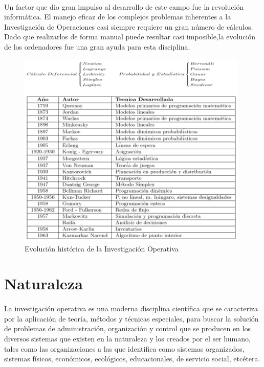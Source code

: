 \documentclass[12pt, a4paper,spanish]{article}
\begin{document}
		\paragraph{}
		Un factor que dio gran impulso al desarrollo de este campo fue la revolución informática. El manejo eficaz de los complejos problemas inherentes a la Investigación de Operaciones casi siempre requiere un gran número de cálculos. Dado que realizarlos de forma manual puede resultar casi imposible,la evolución de los ordenadores fue una gran ayuda para esta disciplina.	\cite{hillier_lieberman_IO}

		\begin{figure}[H]
			\centering
			\includegraphics[width=110mm]{res/desarrollo-historico-de-la-investigacion-de-operaciones.png}
			\caption{Evolución histórica de la Investigación Operativa \protect\cite{gestiopolis_IO_history}}
		\end{figure}


	\section{Naturaleza}
		\paragraph{}
		La investigación operativa es una moderna disciplina científica que se caracteriza por la aplicación de teoría, métodos y técnicas especiales, para buscar la solución de problemas de administración, organización y control que se producen en los diversos sistemas que existen en la naturaleza y los creados por el ser humano, tales como las organizaciones a las que identifica como sistemas organizados, sistemas físicos, económicos, ecológicos, educacionales, de servicio social, etcétera.\cite{wikipedia_IO}
\end{document}
